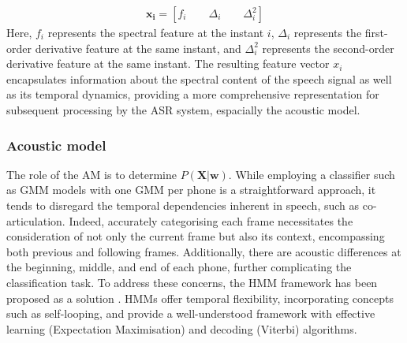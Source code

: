 \begin{align}
    \boldsymbol{x_i} = [f_i \qquad \Delta_i \qquad \Delta^{2}_i]
\end{align}
Here, $f_i$ represents the spectral feature at the instant $i$, $\Delta_i$ represents the first-order derivative feature at the same instant, and $\Delta^2_i$ represents the second-order derivative feature at the same instant. The resulting feature vector $x_i$ encapsulates information about the spectral content of the speech signal as well as its temporal dynamics, providing a more comprehensive representation for subsequent processing by the \ac{ASR} system, espacially the acoustic model.


\subsubsection{Acoustic model}%
The role of the \ac{AM} is to determine $P(\boldsymbol{X}|\boldsymbol{w})$. While employing a classifier such as \ac{GMM} models with one \ac{GMM} per phone is a straightforward approach, it tends to disregard the temporal dependencies inherent in speech, such as co-articulation. Indeed, accurately categorising each frame necessitates the consideration of not only the current frame but also its context, encompassing both previous and following frames. Additionally, there are acoustic differences at the beginning, middle, and end of each phone, further complicating the classification task. To address these concerns, the \ac{HMM} framework has been proposed as a solution \cite{Dragon_system}. \acp{HMM} offer temporal flexibility, incorporating concepts such as self-looping, and provide a well-understood framework with effective learning (Expectation Maximisation) and decoding (Viterbi) algorithms. 


